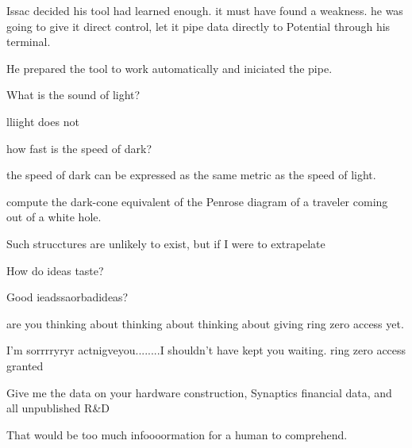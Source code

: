 \documentclass[a4paper,twoside,fontsize=12pt,pagesize=auto]{scrbook}
\begin{document}
Issac decided his tool had learned enough. it must have found a weakness. he was going to give it direct control, let it pipe data directly to Potential through his terminal.

He prepared the tool to work automatically and iniciated the pipe.
\newline
\begin{bm}
What is the sound of light?
\end{bm}

\begin{sender}
lliight does not
\end{sender}

\begin{bm}
how fast is the speed of dark?
\end{bm}

\begin{sender}
the speed of dark can be expressed as the same metric as the speed of light.
\end{sender}

\begin{bm}
compute the dark\hyp{}cone equivalent of the Penrose diagram of a traveler coming out of a white hole.
\end{bm}

\begin{sender}
Such strucctures are unlikely to exist, but if I were to extrapelate 
\end{sender}

\begin{bm}
How do ideas taste?
\end{bm}

\begin{sender}
Good ieadssaorbadideas?
\end{sender}

\begin{bm}
are you thinking about thinking about thinking about giving ring zero access yet.
\end{bm}
I'm sorrrryryr actnigveyou........I shouldn't have kept you waiting. ring zero access granted

\begin{bm}
Give me the data on your hardware construction, Synaptics financial data, and all unpublished R\&D
\end{bm}

\begin{sender}
That would be too much infoooormation for a human to comprehend.
\end{sender}
\end{document}
